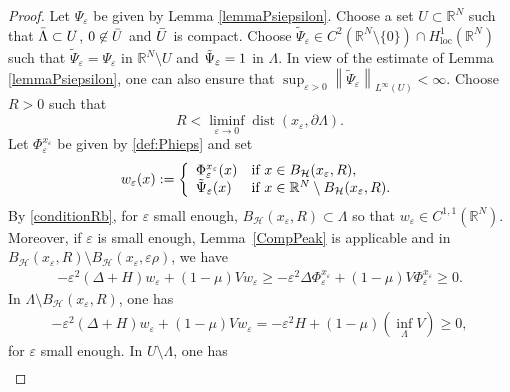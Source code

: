 \documentclass[a4paper]{amsart}
\begin{document}
 \begin{proof}
Let $\Psi_\varepsilon$ be given by Lemma \ref{lemmaPsiepsilon}. Choose a set $U \subset {\mathbb{R}}^N$ such that $\Bar{\Lambda}
\subset U$, $0 \not \in \Bar{U}$ and $\Bar{U}$ is compact. 
Choose $\tilde{\Psi}_\varepsilon \in C^2({\mathbb{R}}^N\setminus\lbrace 0 \rbrace) \cap H^1_{\text{loc}}({\mathbb{R}}^N)$ such that
$\tilde{\Psi}_\varepsilon = \Psi_\varepsilon$ in ${\mathbb{R}}^N\setminus U$ and $\Tilde{\Psi}_\varepsilon = 1$ in
$\Lambda$. In view of the estimate of Lemma \ref{lemmaPsiepsilon}, one can also ensure that  
$\sup_{\varepsilon > 0} {\left\| {\tilde{\Psi}_\varepsilon} \right\|}_{L^\infty(U)}< \infty$.  
Choose $R>0$ such that 
\begin{equation}
\label{conditionRb}
 R < \liminf_{\varepsilon \to 0} {\mathop{\mathrm{dist}}}(x_\varepsilon, \partial \Lambda).
\end{equation}
Let $\Phi^{x_\varepsilon}_{\varepsilon}$ be given by \eqref{def:Phieps} and set
\begin{align*}
 w_{\varepsilon}(x) := \left\{ \begin{array}{ll}  
  \Phi^{x_\varepsilon}_{\varepsilon}(x) & \textnormal{if}\ x \in  B_\mathcal{H}(x_{\varepsilon},R), \\
  \Tilde{\Psi}_\varepsilon(x) & \textnormal{if}\ x \in  {\mathbb{R}}^N\setminus B_\mathcal{H}(x_{\varepsilon},R).
 \end{array} 
 \right.
\end{align*}
By \eqref{conditionRb}, for $\varepsilon$ small enough, $ B_\mathcal{H}(x_{\varepsilon},R) \subset \Lambda$ so that
$w_{\varepsilon} \in
C^{1,1}({\mathbb{R}}^N)$. Moreover, if $\varepsilon$ is small enough, Lemma~\ref{CompPeak} is applicable and in $
B_\mathcal{H}(x_{\varepsilon},R) \setminus  B_\mathcal{H}(x_{\varepsilon},\varepsilon \rho)$, we have
\begin{align*}
 -\varepsilon^2 \left( \Delta + H\right)  w_{\varepsilon} + (1-\mu) V w_{\varepsilon} \geq -\varepsilon^2 \Delta
\Phi^{x_\varepsilon}_{\varepsilon} +
(1-\mu) V \Phi^{x_\varepsilon}_{\varepsilon} \geq 0.
\end{align*}
In $\Lambda\setminus B_\mathcal{H}(x_{\varepsilon},R)$, one has
\begin{align*}
 -\varepsilon^2 \left( \Delta + H\right)  w_{\varepsilon} + (1-\mu) V w_{\varepsilon} = -\varepsilon^2  H + (1-\mu) \left(
\inf_{\Lambda} V \right) \geq 0,
\end{align*}
for $\varepsilon$ small enough.
In $U \setminus \Lambda$, one has
\begin{align*}

\end{align*}
\end{proof}
\end{document}
